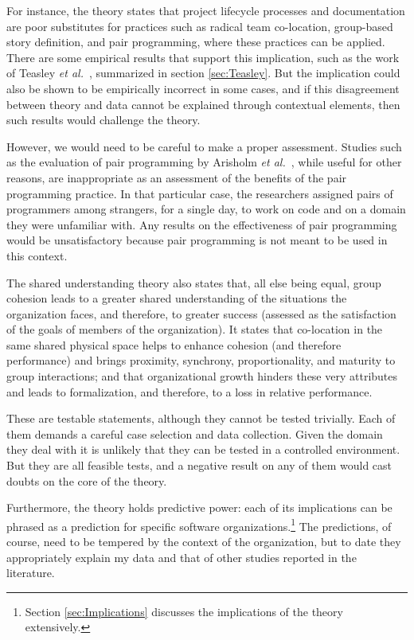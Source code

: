 For instance, the theory states that project lifecycle processes and documentation are poor substitutes for practices such as radical team co-location, group-based story definition, and pair programming, where these practices can be applied. There are some empirical results that support this implication, such as the work of Teasley \emph{et al.}\ , summarized in section \ref{sec:Teasley}. But the implication could also be shown to be empirically incorrect in some cases, and if this disagreement between theory and data cannot be explained through contextual elements, then such results would challenge the theory.

However, we would need to be careful to make a proper assessment. Studies such as the evaluation of pair programming by Arisholm \emph{et al.}\ , while useful for other reasons, are inappropriate as an assessment of the benefits of the pair programming practice. In that particular case, the researchers assigned pairs of programmers among strangers, for a single day, to work on code and on a domain they were unfamiliar with. Any results on the effectiveness of pair programming would be unsatisfactory because pair programming is not meant to be used in this context.

The shared understanding theory also states that, all else being equal, group cohesion leads to a greater shared understanding of the situations the organization faces, and therefore, to greater success (assessed as the satisfaction of the goals of members of the organization). It states that co-location in the same shared physical space helps to enhance cohesion (and therefore performance) and brings proximity, synchrony, proportionality, and maturity to group interactions; and that organizational growth hinders these very attributes and leads to formalization, and therefore, to a loss in relative performance.

These are testable statements, although they cannot be tested trivially. Each of them demands a careful case selection and data collection. Given the domain they deal with it is unlikely that they can be tested in a controlled environment. But they are all feasible tests, and a negative result on any of them would cast doubts on the core of the theory.

Furthermore, the theory holds predictive power: each of its implications can be phrased as a prediction for specific software organizations.\footnote{Section \ref{sec:Implications} discusses the implications of the theory extensively.} The predictions, of course, need to be tempered by the context of the organization, but to date they appropriately explain my data and that of other studies reported in the literature.


